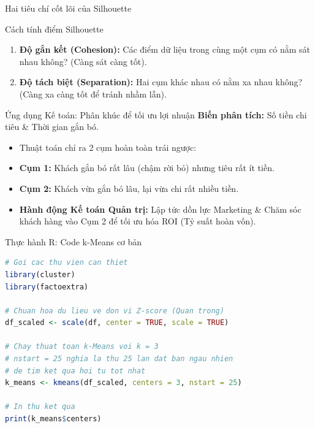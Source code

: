 \documentclass[aspectratio=169]{beamer}
\begin{document}
\begin{frame}{Hai tiêu chí cốt lõi của Silhouette}
    \begin{block}{Cách tính điểm Silhouette}
        \begin{enumerate}
            \item \textbf{Độ gắn kết (Cohesion):} Các điểm dữ liệu trong cùng một cụm có nằm sát nhau không? (Càng sát càng tốt).
            \item \textbf{Độ tách biệt (Separation):} Hai cụm khác nhau có nằm xa nhau không? (Càng xa càng tốt để tránh nhầm lẫn).
        \end{enumerate}
    \end{block}
\end{frame}

\begin{frame}{Ứng dụng Kế toán: Phân khúc để tối ưu lợi nhuận}
    \textbf{Biến phân tích:} Số tiền chi tiêu \& Thời gian gắn bó.
    \begin{itemize}
        \item Thuật toán chỉ ra 2 cụm hoàn toàn trái ngược:
        \item \textbf{Cụm 1:} Khách gắn bó rất lâu (chậm rời bỏ) nhưng tiêu rất ít tiền.
        \item \textbf{Cụm 2:} Khách vừa gắn bó lâu, lại vừa chi rất nhiều tiền.
        \item \textbf{Hành động Kế toán Quản trị:} Lập tức dồn lực Marketing \& Chăm sóc khách hàng vào Cụm 2 để tối ưu hóa ROI (Tỷ suất hoàn vốn).
    \end{itemize}
\end{frame}

\begin{frame}[fragile]{Thực hành R: Code k-Means cơ bản}
    \begin{lstlisting}[language=R]
# Goi cac thu vien can thiet
library(cluster)
library(factoextra)

# Chuan hoa du lieu ve don vi Z-score (Quan trong)
df_scaled <- scale(df, center = TRUE, scale = TRUE)

# Chay thuat toan k-Means voi k = 3
# nstart = 25 nghia la thu 25 lan dat ban ngau nhien 
# de tim ket qua hoi tu tot nhat
k_means <- kmeans(df_scaled, centers = 3, nstart = 25)

# In thu ket qua
print(k_means$centers)
    \end{lstlisting}
\end{frame}
\end{document}
